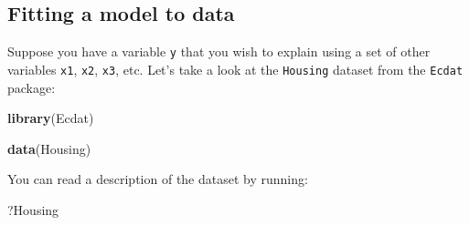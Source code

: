 \documentclass[]{gitbook}
\newenvironment{Shaded}{\begin{snugshade}}{\end{snugshade}}
\newcommand{\KeywordTok}[1]{\textcolor[rgb]{0.13,0.29,0.53}{\textbf{#1}}}
\newcommand{\NormalTok}[1]{#1}
\begin{document}
\hypertarget{fitting-a-model-to-data}{%
\subsection{Fitting a model to data}\label{fitting-a-model-to-data}}

Suppose you have a variable \texttt{y} that you wish to explain using a set of other variables \texttt{x1}, \texttt{x2},
\texttt{x3}, etc. Let's take a look at the \texttt{Housing} dataset from the \texttt{Ecdat} package:

\begin{Shaded}
\begin{Highlighting}[]
\KeywordTok{library}\NormalTok{(Ecdat)}

\KeywordTok{data}\NormalTok{(Housing)}
\end{Highlighting}
\end{Shaded}

You can read a description of the dataset by running:

\begin{Shaded}
\begin{Highlighting}[]
\NormalTok{?Housing}
\end{Highlighting}
\end{Shaded}
\end{document}
